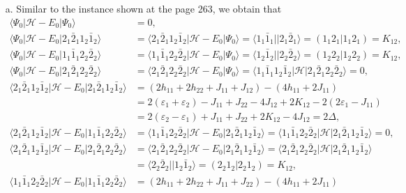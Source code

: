 \documentclass[a4paper]{book}
\begin{document}
\begin{solution}
\begin{itemize}
	\item[a.] Similar to the instance shown at the page 263, we obtain that
	\begin{align*}
		\langle \Psi_0 | \mathscr{H} - E_0 | \Psi_0 \rangle &= 0 , \\
		 \langle \Psi_0 | \mathscr{H} - E_0 | 2_1 \bar{2}_1 1_2 \bar{1}_2 \rangle &= \langle 2_1 \bar{2}_1 1_2 \bar{1}_2 | \mathscr{H} - E_0 | \Psi_0 \rangle = \langle 1_1 \bar{1}_1 || 2_1 \bar{2}_1 \rangle = ( 1_1 2_1 | 1_1 2_1 ) = K_{12} , \\
		 \langle \Psi_0 | \mathscr{H} - E_0 | 1_1 \bar{1}_1 2_2 \bar{2}_2 \rangle &= \langle 1_1 \bar{1}_1 2_2 \bar{2}_2 | \mathscr{H} - E_0 | \Psi_0 \rangle = \langle 1_2 \bar{1}_2 ||  2_2 \bar{2}_2 \rangle = ( 1_2 2_2 | 1_2 2_2 ) = K_{12} , \\
		 \langle \Psi_0 | \mathscr{H} - E_0 | 2_1 \bar{2}_1 2_2 \bar{2}_2 \rangle &= \langle 2_1 \bar{2}_1 2_2 \bar{2}_2 | \mathscr{H} - E_0 | \Psi_0 \rangle = \langle 1_1 \bar{1}_1 1_2 \bar{1}_2 | \mathscr{H} | 2_1 \bar{2}_1 2_2 \bar{2}_2 \rangle = 0, \\
		 \langle 2_1 \bar{2}_1 1_2 \bar{1}_2 | \mathscr{H} - E_0 | 2_1 \bar{2}_1 1_2 \bar{1}_2 \rangle &= ( 2h_{11} + 2h_{22} + J_{11} + J_{12} ) - ( 4 h_{11} + 2J_{11} ) \\
		 &= 2( \varepsilon_1 + \varepsilon_2 ) - J_{11} + J_{22} - 4J_{12} + 2K_{12} - 2( 2\varepsilon_1 - J_{11} ) \\
		 &= 2( \varepsilon_2 - \varepsilon_1 ) + J_{11} + J_{22} + 2K_{12} - 4J_{12} = 2 \Delta , \\
		 \langle 2_1 \bar{2}_1 1_2 \bar{1}_2 | \mathscr{H} - E_0 | 1_1 \bar{1}_1 2_2 \bar{2}_2 \rangle &= \langle 1_1 \bar{1}_1 2_2 \bar{2}_2 | \mathscr{H} - E_0 | 2_1 \bar{2}_1 1_2 \bar{1}_2 \rangle = \langle 1_1 \bar{1}_1 2_2 \bar{2}_2 | \mathscr{H} | 2_1 \bar{2}_1 1_2 \bar{1}_2 \rangle = 0 , \\
		 \langle 2_1 \bar{2}_1 1_2 \bar{1}_2 | \mathscr{H} - E_0 | 2_1 \bar{2}_1 2_2 \bar{2}_2 \rangle &= \langle 2_1 \bar{2}_1 2_2 \bar{2}_2 | \mathscr{H} - E_0 | 2_1 \bar{2}_1 1_2 \bar{1}_2 \rangle = \langle 2_1 \bar{2}_1 2_2 \bar{2}_2 | \mathscr{H} | 2_1 \bar{2}_1 1_2 \bar{1}_2 \rangle \\
		 &= \langle 2_2 \bar{2}_2 || 1_2 \bar{1}_2 \rangle = ( 2_2 1_2 | 2_2 1_2 ) = K_{12}, \\
		 \langle 1_1 \bar{1}_1 2_2 \bar{2}_2 | \mathscr{H} - E_0 | 1_1 \bar{1}_1 2_2 \bar{2}_2 \rangle &= ( 2h_{11} + 2h_{22} + J_{11} + J_{22} ) - ( 4 h_{11} + 2J_{11} ) \\

\end{align*}
\end{itemize}
\end{solution}
\end{document}
